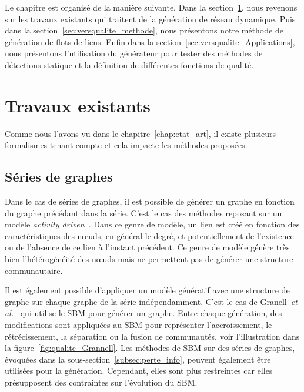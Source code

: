 \bigskip

Le chapitre est organisé de la manière suivante.
Dans la section~\ref{sec:versqualite_existant}, nous revenons sur les travaux existants qui traitent de la génération de réseau dynamique.
Puis dans la section~\ref{sec:versqualite_methode}, nous présentons notre méthode de génération de flots de liens.
Enfin dans la section~\ref{sec:versqualite_Applications}, nous présentons l'utilisation du générateur pour tester des méthodes de détections statique et la définition de différentes fonctions de qualité.

\section{Travaux existants}
\label{sec:versqualite_existant}

Comme nous l'avons vu dans le chapitre~\ref{chap:etat_art}, il existe plusieurs formalismes tenant compte et cela impacte les méthodes proposées.

\subsection{Séries de graphes}
Dans le cas de séries de graphes, il est possible de générer un graphe en fonction du graphe précédant dans la série.
C'est le cas des méthodes reposant sur un modèle \emph{activity driven}~\cite{Perra2012,Laurent2015a,Moinet2015}.
Dans ce genre de modèle, un lien est créé en fonction des caractéristiques des n\oe uds, en général le degré, et potentiellement de l'existence ou de l'absence de ce lien à l'instant précédent.
Ce genre de modèle génère très bien l'hétérogénéité des n\oe uds mais ne permettent pas de générer une structure communautaire.


Il est également possible d'appliquer un modèle génératif avec une structure de graphe sur chaque graphe de la série indépendamment.
C'est le cas de Granell~\emph{et al.}~\cite{Granell2015a} qui utilise le SBM pour générer un graphe.
Entre chaque génération, des modifications sont appliquées au SBM pour représenter l'accroissement, le rétrécissement, la séparation ou la fusion de communautés, voir l'illustration dans la figure~\ref{fig:qualite_Grannell}.
Les méthodes de SBM sur des séries de graphes, évoquées dans la sous-section~\ref{subsec:perte_info}, peuvent également être utilisées pour la génération.
Cependant, elles sont plus restreintes car elles présupposent des contraintes sur l'évolution du SBM.

